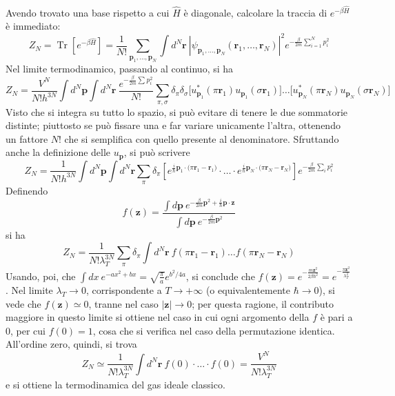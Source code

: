 \documentclass[11pt, a4paper]{scrartcl}
\theoremstyle{style}
\theoremstyle{style1}
\numberwithin{equation}{subsection}
\begin{document}
Avendo trovato una base rispetto a cui $\hat{H}$ \`e diagonale, calcolare la traccia di $e^{-\beta \hat{H}}$ \`e immediato:
\[
Z_N = \operatorname{Tr} \left[ e^{-\beta \hat{H}} \right]  = \frac{1}{N!} \sum_{\mathbf{p} _1,\ldots,\mathbf{p} _N}^{} \int d^N \mathbf{r} \ \left\lvert \psi _{\mathbf{p} _1,\ldots,\mathbf{p} _N} (\mathbf{r} _1,\ldots,\mathbf{r} _N) \right\rvert ^2 e^{-\frac{\beta}{2m} \sum_{i=1}^{N} p_i^2}
\] 
Nel limite termodinamico, passando al continuo, si ha
\[
	Z_N = \frac{V^N}{N! h^{3N}} \int d^N \mathbf{p} \int d^N\mathbf{r} \ \frac{e^{- \frac{\beta}{2m} \sum_{}^{} p_i^2}}{N!} \sum_{\pi,\sigma }^{} \delta _\pi\delta _\sigma \Big[u^* _{\mathbf{p} _1} (\pi\mathbf{r} _1) u_{\mathbf{p} _1} (\sigma \mathbf{r} _1) \Big] \ldots \Big[u^*_{\mathbf{p} _N} (\pi\mathbf{r} _N) u_{ \mathbf{p} _N} (\sigma \mathbf{r} _N)\Big]
\] 
Visto che si integra su tutto lo spazio, si pu\`o evitare di tenere le due sommatorie distinte; piuttosto se pu\`o fissare una e far variare unicamente l'altra, ottenendo un fattore $N!$ che si semplifica con quello presente al denominatore. 
Sfruttando anche la definizione delle $u_\mathbf{p} $, si pu\`o scrivere 
\[
Z_N = \frac{1}{N!h^{3N}} \int d^N\mathbf{p} \int d^N \mathbf{r}  \sum_{\pi}^{} \delta _\pi \left[ e^{\frac{i}{\hbar }\mathbf{p} _1\cdot  \big(\pi\mathbf{r} _1 -\mathbf{r} _1\big)} \cdot \ldots \cdot e^{\frac{i}{\hbar }\mathbf{p} _N \cdot \big(\pi\mathbf{r} _N -\mathbf{r} _N\big)}\right] e^{-\frac{\beta }{2m}\sum_{i}^{} p_i^2}
\] 
Definendo 
\[
f(\mathbf{z} ) = \frac{\displaystyle \int d\mathbf{p} \ e^{-\frac{\beta}{2m} \mathbf{p} ^2 + \frac{i}{\hbar }\mathbf{p} \cdot \mathbf{z} }}{\displaystyle \int d\mathbf{p}\ e^{-\frac{\beta}{2m} \mathbf{p} ^2}}
\] 
si ha
\[
Z_N = \frac{1}{N!\lambda _T^{3N}} \sum_{\pi}^{} \delta _\pi \int d^N\mathbf{r} \ f(\pi\mathbf{r} _1 - \mathbf{r} _1) \ldots f(\pi\mathbf{r} _N - \mathbf{r} _N)
\] 
Usando, poi, che $\int dx \ e^{-ax^2 + bx} = \sqrt{\frac{\pi}{a}}  e^{b^2 / 4a}$, si conclude che $f(\mathbf{z} ) = e^{- \frac{m\mathbf{z} ^2}{2\beta \hbar ^2}} = e^{- \frac{\pi\mathbf{z} ^2}{\lambda _T^2}}$.
Nel limite $\lambda _T \to 0$, corrispondente a $T\to +\infty$ (o equivalentemente $\hbar \to 0$), si vede che $f(\mathbf{z} ) \simeq 0$, tranne nel caso $\lvert \mathbf{z}  \rvert \to 0$; per questa ragione, il contributo maggiore in questo limite si ottiene nel caso in cui ogni argomento della $f$ \`e pari a $0$, per cui $f(0) = 1$, cosa che si verifica nel caso della permutazione identica.
All'ordine zero, quindi, si trova 
\[
Z_N \simeq \frac{1}{N!\lambda _T^{3N}} \int d^N \mathbf{r}  \ f(0) \cdot \ldots\cdot f(0) = \frac{V^N}{N!\lambda _T^{3N} }
\] 
e si ottiene la termodinamica del gas ideale classico.
\end{document}
